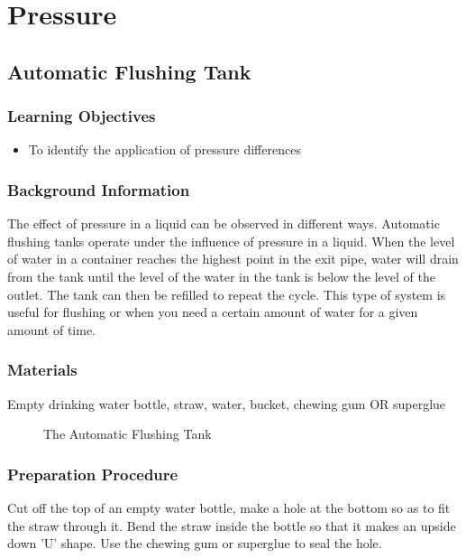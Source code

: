 \section{Pressure}

\subsection{Automatic Flushing Tank}

\subsubsection*{Learning Objectives}
\begin{itemize}
\item{To identify the application of pressure differences}
\end{itemize}

\subsubsection*{Background Information}
The effect of pressure in a liquid can be observed in different ways. Automatic flushing tanks operate under the influence of pressure in a liquid. When the level of water in a container reaches the highest point in the exit pipe, water will drain from the tank until the level of the water in the tank is below the level of the outlet. The tank can then be refilled to repeat the cycle. This type of system is useful for flushing or when you need a certain amount of water for a given amount of time.

\subsubsection*{Materials}
Empty drinking water bottle, straw, water, bucket, chewing gum OR superglue

\begin{figure}
\begin{center}
\def\svgwidth{150pt}

\caption{The Automatic Flushing Tank}
\label{fig:auto-flushing-tank}
\end{center}
\end{figure}

\subsubsection*{Preparation Procedure}
Cut off the top of an empty water bottle, make a hole at the bottom so as to fit the straw through it. 
Bend the straw inside the bottle so that it makes an upside down 'U' shape. Use the chewing gum or superglue to seal the hole.

